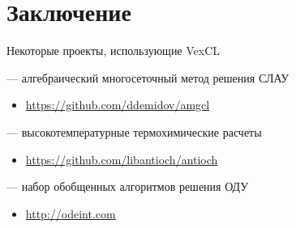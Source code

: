 \documentclass[@BEAMER_OPTIONS@]{beamer}
\begin{document}

\section{Заключение}

\begin{frame}{Некоторые проекты, использующие VexCL}
    \begin{description}[\quad]
        \item[AMGCL] --- алгебраический многосеточный метод решения СЛАУ
            \begin{itemize}
                \item \href{https://github.com/ddemidov/amgcl}{https://github.com/ddemidov/amgcl}
            \end{itemize}
            \vspace{\baselineskip}
        \item[Antioch] --- высокотемпературные термохимические расчеты
            \begin{itemize}
                \item \href{https://github.com/libantioch/antioch}{https://github.com/libantioch/antioch}
            \end{itemize}
            \vspace{\baselineskip}
        \item[Boost.odeint] --- набор обобщенных алгоритмов решения ОДУ
            \begin{itemize}
                \item \href{http://odeint.com}{http://odeint.com}
            \end{itemize}
    \end{description}
\end{frame}
\end{document}
